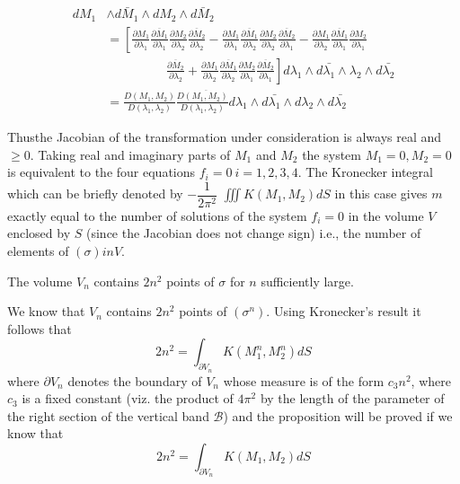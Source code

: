 \begin{align*}
dM_1 & \wedge d\bar{M}_1  \wedge dM_2 \wedge d \bar{M}_2 \\
  & = \left[ \frac{\partial M_1}{\partial \lambda_1}
    \frac{\overline{\partial M_1}}{\partial \lambda_1} \frac{\partial
      M_2}{\partial \lambda_2} \frac{\overline{\partial M_2}}{\partial
      \lambda_2}  - \frac{\partial M_1}{\partial \lambda_1}
    \frac{\overline{\partial M_1}}{\partial \lambda_2} \frac{\partial
      M_2}{\partial \lambda_2}  \frac{\overline{\partial
        M_2}}{\partial \lambda_1} - \frac{\partial M_1}{\partial
      \lambda_2} \frac{\overline{\partial M_1}}{\partial \lambda_1}
    \frac{\partial M_2}{\partial \lambda_1}\right.\\ 
    & \left.\hspace{2cm} \frac{\overline{\partial
        M_2}}{\partial \lambda_2}  + \frac{\partial M_1}{\partial
      \lambda_2} \frac{\overline{\partial M_1}}{\partial \lambda_2}
    \frac{\partial M_2}{\partial \lambda_1}  \frac{\overline{\partial
        M_2}}{\partial \lambda_1} \right] d \lambda_1 \wedge d
  \bar{\lambda_1} \wedge \lambda_2 \wedge d \bar{\lambda_2} \\ 
  &= \frac{D(M_1,  M_2)}{D (\lambda_1,  \lambda_2)}
  \frac{D\overline{(M_1,  M_2)}}{D (\lambda_1,  \lambda_2 )} d
  \lambda_1 \wedge d \bar{\lambda_1} \wedge d \lambda_2 \wedge d
  \bar{\lambda_2} 
\end{align*}

Thus\pageoriginale the Jacobian of the transformation under consideration is always
real and $\geq 0$. Taking real and imaginary parts of $M_1$ and $M_2$
the system $M_1 =0,  M_2 = 0$ is equivalent to the four equations $f_i
= 0 ~ i = 1, 2, 3, 4$. The Kronecker integral which can be briefly
denoted by $- \dfrac{1}{2 \pi^2}$ $\iiint K (M_1,  M_2) dS$ in this case
gives $m$ exactly equal to the number of solutions of the system $f_i
= 0$ in the volume $V$ enclosed by $S$ (since the Jacobian does not
change sign) i.e., the number of elements of $(\sigma) in V$. 

\begin{proposition}\label{part2:chap3:sec8:prop4}%
  The volume $V_n$ contains $2n^2$ points of $\sigma$ for $n$
  sufficiently large. 
\end{proposition}

We know that $V_n$ contains $2n^2$ points of $(\sigma^n)$. Using
Kronecker's result it follows that 
$$
2n^2 = \int_{\partial V_n} K (M^n_1,  M^n_2) dS
$$
where $\partial V_n$ denotes the boundary of $V_n$ whose measure is of
the form $c_3 n^2$, where $c_3$ is a fixed constant (viz. the product
of $4 \pi^2$ by the length of the parameter of the right section of
the vertical band $\mathscr{B}$) and the proposition will be proved if
we know that  
\begin{equation}
  2n^2 = \int_{\partial V_n} K (M_1,  M_2)d S\tag{i}\label{part2:chap3:sec8:eqi}
\end{equation}

